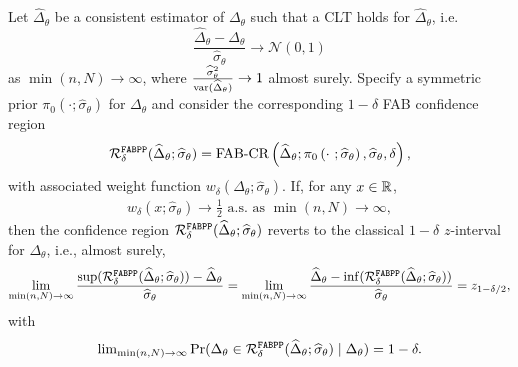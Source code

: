 \begin{lemma}
    \label{lemma:fabcr_horseshoe_convergence}
    Let $\widehat{\Delta}_\theta$ be a consistent estimator of $\Delta_\theta$ such that a CLT holds for $\widehat{\Delta}_\theta$, i.e.
    \begin{equation*}
        \frac{\widehat{\Delta}_\theta - \Delta_\theta}{\widehat{\sigma}_\theta } \to \mathcal{N}(0, 1)
    \end{equation*}
    as $\min(n,N) \to \infty$, where $\frac{\widehat{\sigma}_\theta^2}{\mathrm{var}(\widehat{\Delta}_\theta)}\to 1$ almost surely. Specify a symmetric prior $\pi_{0}(\cdot; \widehat{\sigma}_\theta)$  for $\Delta_\theta$ and consider the corresponding $1 - \delta$ FAB confidence region
    \begin{equation*}
        \mathcal R^{\mathrm{\texttt{FABPP}}}_\delta(\widehat{\Delta}_\theta; \widehat{\sigma}_\theta ) = \text{FAB-CR}\left(\widehat{\Delta}_\theta; \pi_{0}\left(\cdot~; \widehat{\sigma}_\theta\right), \widehat{\sigma}_\theta, \delta\right),
    \end{equation*}
    with associated weight function $w_\delta(\Delta_\theta; \widehat{\sigma}_\theta)$. If, for any $x\in\mathbb R$,
    \begin{align}
        w_\delta\left(x; \widehat{\sigma}_\theta\right)\to \frac{1}{2}\text{ a.s. as }\min(n,N)\to\infty, \label{eq:wtendstohalf}
    \end{align}
    then the confidence region $\mathcal R^{\mathrm{\texttt{FABPP}}}_\delta(\widehat{\Delta}_\theta; \widehat{\sigma}_\theta )$  reverts to the classical $1 - \delta$ $z$-interval for $\Delta_\theta$, i.e., almost surely,
    \begin{equation*}
        \lim_{\min(n,N) \to \infty} \frac{\sup(\mathcal R^{\mathrm{\texttt{FABPP}}}_\delta(\widehat{\Delta}_\theta; \widehat{\sigma}_\theta )) - \widehat{\Delta}_\theta}{\widehat{\sigma}_\theta} = \lim_{\min(n,N) \to \infty} \frac{\widehat{\Delta}_\theta - \inf(\mathcal R^{\mathrm{\texttt{FABPP}}}_\delta(\widehat{\Delta}_\theta; \widehat{\sigma}_\theta ))}{\widehat{\sigma}_\theta} = z_{1 - \delta / 2},
    \end{equation*}
    with
    \begin{align}
        {\lim}_{\min(n,N)\to\infty}\Pr(\Delta_\theta \in \mathcal R^{\mathrm{\texttt{FABPP}}}_\delta(\widehat{\Delta}_\theta; \widehat{\sigma}_\theta )\mid \Delta_\theta)=1-\delta.\label{eq:coverageDelta}
    \end{align}
\end{lemma}
